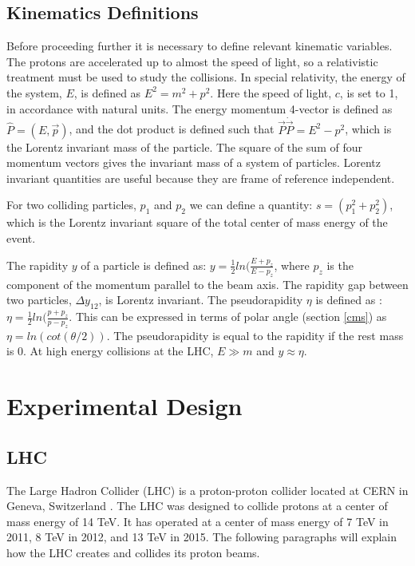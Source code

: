 \documentclass[oneside, letterpaper, oldfontcommands]{memoir}
\begin{document}
\section{Kinematics Definitions}\label{kindef}
\qquad Before proceeding further it is necessary to define relevant kinematic variables. The protons are accelerated up to almost the speed of light, so a relativistic treatment must be used to study the collisions.   In special relativity, the energy of the system, $E$, is defined as $E^{2} = m^{2}+p^{2}$. Here the speed of light, $c$, is set to 1, in accordance with natural units. The energy momentum 4-vector is defined as $ \hat{P} = (E, \vec{p})$, and the dot product is defined such that $\vec{P} \dot \vec{P} = E^{2}-p^{2}$, which is the Lorentz invariant mass of the particle. The square of the sum of four momentum vectors gives the invariant mass of a system of particles. Lorentz invariant quantities are useful because they are frame of reference independent. 

\qquad For two colliding particles, $p_{1}$ and $p_{2}$ we can define a quantity: $s = (p_{1}^2+p_{2}^2)$, which is the Lorentz invariant square of the total center of mass energy of the event.

\qquad The rapidity $y$ of a particle is defined as: $y = \frac{1}{2}ln(\frac{E+p_{z}}{E-p_{z}}$, where $p_{z}$ is the component of the momentum parallel to the beam axis. The rapidity gap between two particles, $\Delta y_{12}$, is Lorentz invariant. The pseudorapidity $\eta$ is defined as : $\eta = \frac{1}{2}ln(\frac{p+p_{z}}{p-p_{z}}$. This can be expressed in terms of polar angle (section \ref{cms}) as $\eta = ln(cot(\theta /2))$. The pseudorapidity is equal to the rapidity if the rest mass is 0. At high energy collisions at the LHC, $E \gg m$ and $y \approx \eta$.

\chapter{Experimental Design}\label{experiment}

\section{LHC}\label{lhc}

\qquad The Large Hadron Collider (LHC) is a proton-proton collider located at CERN in Geneva, Switzerland \cite{1748-0221-3-08-S08001}. The LHC was designed to collide protons at a center of mass energy of 14 TeV. It has operated at a center of mass energy of 7 TeV in 2011, 8 TeV in 2012, and 13 TeV in 2015. The following paragraphs will explain how the LHC creates and collides its proton beams.
\end{document}
